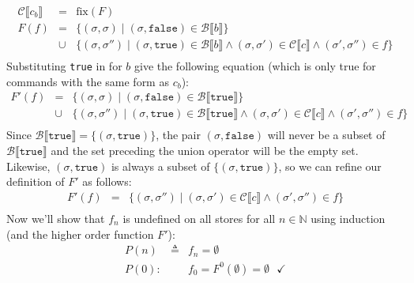 \documentclass[10pt, oneside]{article}
\begin{document}
\begin{enumerate}[1.]
\begin{enumerate} [(a)]
      \begin{eqnarray*}
        \mathcal{C} \llbracket c_b \rrbracket & = & \text{fix}(F) \\
        F(f) & = & \{ (\sigma, \sigma) \mid (\sigma, \texttt{false}) \in 
                                           \mathcal{B} \llbracket b \rrbracket \}\\
            & \cup & \{(\sigma, \sigma'') 
               \mid (\sigma, \texttt{true}) \in \mathcal{B} \llbracket b\rrbracket
             \wedge (\sigma, \sigma') \in \mathcal{C} \llbracket c \rrbracket 
             \wedge (\sigma', \sigma'') \in f \} \\
      \end{eqnarray*}
      Substituting \texttt{true} in for $b$ give the following equation (which is 
      only true for commands with the same form as $c_b$):
      \begin{eqnarray*}
        F'(f) & = & \{ (\sigma, \sigma) \mid (\sigma, \texttt{false}) \in 
                               \mathcal{B} \llbracket \texttt{true} \rrbracket \}\\
            & \cup & \{(\sigma, \sigma'') 
    \mid (\sigma, \texttt{true}) \in \mathcal{B} \llbracket \texttt{true}\rrbracket
             \wedge (\sigma, \sigma') \in \mathcal{C} \llbracket c \rrbracket 
             \wedge (\sigma', \sigma'') \in f \} \\
      \end{eqnarray*} 
      Since $\mathcal{B} \llbracket \texttt{true} \rrbracket = \{(\sigma, 
      \texttt{true})\}$, the pair $(\sigma, \texttt{false})$ will never be a subset 
      of $\mathcal{B} \llbracket \texttt{true} \rrbracket$ and the set preceding 
      the union operator will be the empty set. Likewise, $(\sigma, \texttt{true})$ 
      is always a subset of $\{(\sigma, \texttt{true})\}$, so we can refine our 
      definition of $F'$ as follows:
            \begin{eqnarray*}
        F'(f) & = &  \{(\sigma, \sigma'') 
    					    \mid (\sigma, \sigma') \in \mathcal{C} \llbracket c \rrbracket 
                \wedge (\sigma', \sigma'') \in f \} \\
      \end{eqnarray*} 
      Now we'll show that $f_n$ is undefined on all stores for all $n \in
      \mathbb{N}$ using induction (and the higher order function $F'$):
      \begin{eqnarray*}
        P(n)  & \triangleq & f_n = \emptyset \\
        P(0): & & f_0 = F^0(\emptyset) = \emptyset \text{ } \checkmark \\

\end{eqnarray*}
\end{enumerate}
\end{enumerate}
\end{document}
